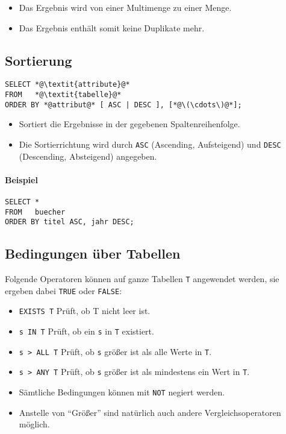 \documentclass[a4paper, 11pt, accentcolor = tud3b]{tudreport}
\begin{document}
                \begin{itemize}
                	\item Das Ergebnis wird von einer Multimenge zu einer Menge.
                	\item Das Ergebnis enthält somit keine Duplikate mehr.
                \end{itemize}

            \subsection{Sortierung} %
            	\begin{lstlisting}
SELECT *@\textit{attribute}@*
FROM   *@\textit{tabelle}@*
ORDER BY *@attribut@* [ ASC | DESC ], [*@\(\cdots\)@*];
            	\end{lstlisting}
            	
            	\begin{itemize}
            		\item Sortiert die Ergebnisse in der gegebenen Spaltenreihenfolge.
            		\item Die Sortierrichtung wird durch \lstinline|ASC| (Ascending, Aufsteigend) und \lstinline|DESC| (Descending, Absteigend) angegeben.
            	\end{itemize}
	            
	            \paragraph{Beispiel}
	            	\begin{lstlisting}
SELECT *
FROM   buecher
ORDER BY titel ASC, jahr DESC;
	            	\end{lstlisting}

			\subsection{Bedingungen über Tabellen} %
				Folgende Operatoren können auf ganze Tabellen \texttt{T} angewendet werden, sie ergeben dabei \lstinline|TRUE| oder \lstinline|FALSE|:
				\begin{itemize}
					\item \lstinline|EXISTS T|  \tabto{2.5cm} Prüft, ob T nicht leer ist.
					\item \lstinline|s IN T|    \tabto{2.5cm} Prüft, ob ein \texttt{s} in \texttt{T} existiert.
					\item \lstinline|s > ALL T| \tabto{2.5cm} Prüft, ob \texttt{s} größer ist als alle Werte in \texttt{T}.
					\item \lstinline|s > ANY T| \tabto{2.5cm} Prüft, ob \texttt{s} größer ist als mindestens ein Wert in \texttt{T}.
					\item Sämtliche Bedingungen können mit \lstinline|NOT| negiert werden.
					\item Anstelle von \enquote{Größer} sind natürlich auch andere Vergleichsoperatoren möglich.
				\end{itemize}
\end{document}
